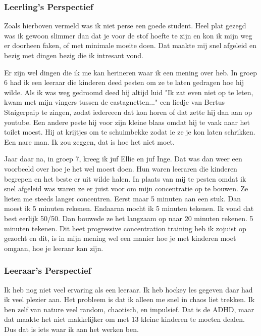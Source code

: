 \documentclass{article}
\begin{document}
            \subsubsection{Leerling's Perspectief}

                Zoals hierboven vermeld was ik niet perse een goede student. Heel plat gezegd was ik gewoon slimmer dan dat je voor de stof hoefte te zijn en kon ik mijn weg er doorheen faken, of met minimale moeite doen. Dat maakte mij snel afgeleid en bezig met dingen bezig die ik intresant vond.
                
                Er zijn wel dingen die ik me kan herineren waar ik een mening over heb. In groep 6 had ik een leeraar die kinderen deed pesten om ze te laten gedragen hoe hij wilde. Als ik was weg gedroomd deed hij altijd luid "Ik zat even niet op te leten, kwam met mijn vingers tussen de castagnetten..." een liedje van Bertus Staigerpaip te zingen, zodat iedereeen dat kon horen of dat zette hij dan aan op youtube. Een andere peste hij voor zijn kleine blaas omdat hij te vaak naar het toilet moest. Hij at krijtjes om te schuimbekke zodat ie ze je kon laten schrikken. Een nare man. Ik zou zeggen, dat is hoe het niet moet.
                
                Jaar daar na, in groep 7, kreeg ik juf Ellie en juf Inge. Dat was dan weer een voorbeeld over hoe je het wel moest doen. Hun waren leeraren die kinderen begrepen en het beste er uit wilde halen. In plaats van mij te pesten omdat ik snel afgeleid was waren ze er juist voor om mijn concentratie op te bouwen. Ze lieten me steeds langer concentren. Eerst maar 5 minuten aan een stuk. Dan moest ik 5 minuten rekenen. Endaarna mocht ik 5 minuten tekenen. Ik vond dat best eerlijk 50/50. Dan bouwede ze het langzaam op naar 20 minuten rekenen. 5 minuten tekenen. Dit heet progressive concentration training heb ik zojuist op gezocht en dit, is in mijn mening wel een manier hoe je met kinderen moet omgaan, hoe je leeraar kan zijn.

            \subsubsection{Leeraar's Perspectief}

                Ik heb nog niet veel ervaring als een leeraar. Ik heb hockey les gegeven daar had ik veel plezier aan. Het probleem is dat ik alleen me snel in chaos liet trekken. Ik ben zelf van nature veel random, chaotisch, en impulsief. Dat is de ADHD, maar dat maakte het niet makkelijker om met 13 kleine kinderen te moeten dealen. Dus dat is iets waar ik aan het werken ben.
                
\end{document}
